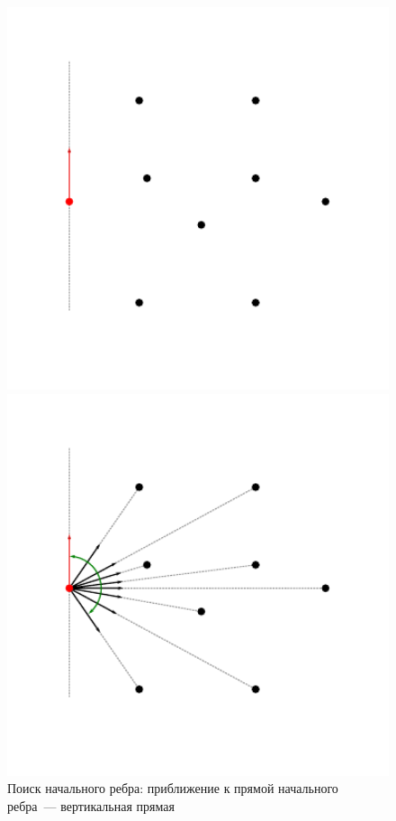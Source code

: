 \documentclass[14pt]{extarticle}
\begin{document}
\begin{figure}[t]
\begin{minipage}{0.4\textwidth}
    \hspace*{-0.1\textwidth}\includegraphics[width=1.25\textwidth]{gift2.pdf}

    \vspace*{-7ex}

    \caption{Поиск начального ребра: приближение к прямой начального ребра~--- вертикальная прямая}

    \label{fig:2D_2}
  \end{minipage}
  \hfill{}

  {}\hfill%
  \begin{minipage}{0.4\textwidth}
    \centering

    \hspace*{-0.1\textwidth}\includegraphics[width=1.25\textwidth]{gift3.pdf}


\end{minipage}
\end{figure}
\end{document}
